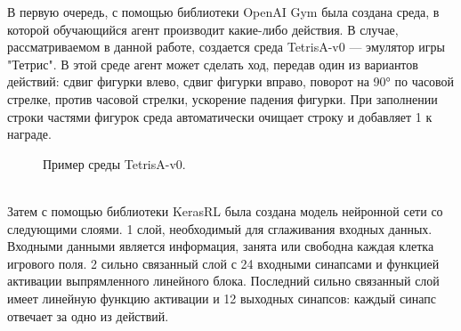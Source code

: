 \documentclass{article}
\begin{document}
\newpage
В первую очередь, с помощью библиотеки OpenAI Gym была создана среда, в которой обучающийся агент производит какие-либо действия. В случае, рассматриваемом в данной работе, создается среда TetrisA-v0 — эмулятор игры "Тетрис". В этой среде агент может сделать ход, передав один из вариантов действий: сдвиг фигурки влево, сдвиг фигурки вправо, поворот на 90° по часовой стрелке, против часовой стрелки, ускорение падения фигурки. При заполнении строки частями фигурок среда автоматически очищает строку и добавляет 1 к награде.\\
\begin{figure}[h]
\caption{Пример среды TetrisA-v0.}
\label{ris:image}
\end{figure}\\
\newpage
Затем с помощью библиотеки KerasRL была создана модель нейронной сети со следующими слоями. 1 слой, необходимый для сглаживания входных данных. Входными данными является информация, занята или свободна каждая клетка игрового поля. 2 сильно связанный слой с 24 входными синапсами и функцией активации выпрямленного линейного блока. Последний сильно связанный слой имеет линейную функцию активации и 12 выходных синапсов: каждый синапс отвечает за одно из действий.\\
\end{document}
